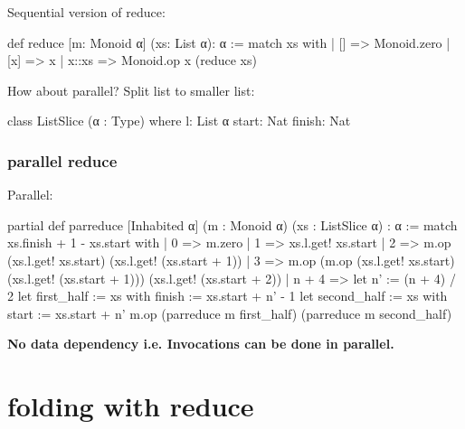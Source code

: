 \documentclass{beamer}
\begin{document}
\begin{frame}[fragile]
    Sequential version of \textsf{reduce}:
    \begin{leancode}
        def reduce [m: Monoid α] (xs: List α): α :=
        match xs with
        | [] => Monoid.zero
        | [x] => x
        | x::xs => Monoid.op x (reduce xs)
    \end{leancode}
    How about parallel?
    Split list to smaller list:
    \begin{leancode}
        class ListSlice (α : Type) where
        l: List α
        start: Nat
        finish: Nat
    \end{leancode}
\end{frame}
\begin{frame}[fragile]
    \frametitle{parallel reduce}
    Parallel:
    \begin{leancode}
        partial def parreduce [Inhabited α] (m : Monoid α) (xs : ListSlice α) : α :=
        match xs.finish + 1 - xs.start with
        | 0 => m.zero
        | 1 => xs.l.get! xs.start
        | 2 => m.op (xs.l.get! xs.start) (xs.l.get! (xs.start + 1))
        | 3 =>
        m.op
        (m.op (xs.l.get! xs.start) (xs.l.get! (xs.start + 1)))
        (xs.l.get! (xs.start + 2))
        | n + 4 =>
        let n' := (n + 4) / 2
        let first_half := {xs with finish := xs.start + n' - 1}
        let second_half := {xs with start := xs.start + n'}
        m.op
        (parreduce m first_half)
        (parreduce m second_half)
    \end{leancode}
    \textbf{No data dependency i.e. Invocations can be done in parallel.}
\end{frame}
\section{folding with reduce}
\end{document}
